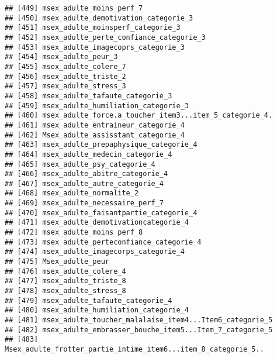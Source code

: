 \documentclass[
]{article}
\begin{document}
\begin{verbatim}
## [449] msex_adulte_moins_perf_7                                         
## [450] msex_adulte_demotivation_categorie_3                             
## [451] msex_adulte_moinsperf_categorie_3                                
## [452] msex_adulte_perte_confiance_categorie_3                          
## [453] msex_adulte_imagecoprs_categorie_3                               
## [454] msex_adulte_peur_3                                               
## [455] msex_adulte_colere_7                                             
## [456] msex_adulte_triste_2                                             
## [457] msex_adulte_stress_3                                             
## [458] msex_adulte_tafaute_categorie_3                                  
## [459] msex_adulte_humiliation_categorie_3                              
## [460] msex_adulte_force.a_toucher_item3...item_5_categorie_4.          
## [461] msex_adulte_entraineur_categorie_4                               
## [462] Msex_adulte_assisstant_categorie_4                               
## [463] msex_adulte_prepaphysique_categorie_4                            
## [464] msex_adulte_medecin_categorie_4                                  
## [465] msex_adulte_psy_categorie_4                                      
## [466] msex_adulte_abitre_categorie_4                                   
## [467] msex_adulte_autre_categorie_4                                    
## [468] msex_adulte_normalite_2                                          
## [469] msex_adulte_necessaire_perf_7                                    
## [470] msex_adulte_faisantpartie_categorie_4                            
## [471] msex_adulte_demotivationcategorie_4                              
## [472] msex_adulte_moins_perf_8                                         
## [473] msex_adulte_perteconfiance_categorie_4                           
## [474] msex_adulte_imagecorps_categorie_4                               
## [475] Msex_adulte_peur                                                 
## [476] msex_adulte_colere_4                                             
## [477] msex_adulte_triste_8                                             
## [478] msex_adulte_stress_8                                             
## [479] msex_adulte_tafaute_categorie_4                                  
## [480] msex_adulte_humiliation_categorie_4                              
## [481] msex_adulte_toucher_malalaise_item4...Item6_categorie_5          
## [482] msex_adulte_embrasser_bouche_item5...Item_7_categorie_5          
## [483] Msex_adulte_frotter_partie_intime_item6...item_8_categorie_5..   

\end{verbatim}
\end{document}
